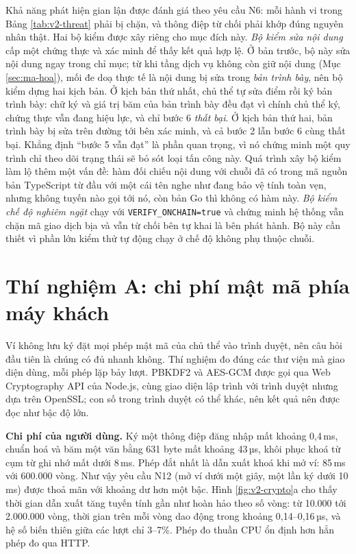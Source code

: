 Khả năng phát hiện gian lận được đánh giá theo yêu cầu N6: mỗi hành vi trong Bảng \ref{tab:v2-threat} phải bị chặn, và thông điệp từ chối phải khớp đúng nguyên nhân thật. Hai bộ kiểm được xây riêng cho mục đích này. \textit{Bộ kiểm sửa nội dung} cấp một chứng thực và xác minh để thấy kết quả hợp lệ. Ở bản trước, bộ này sửa nội dung ngay trong chỉ mục; từ khi tầng dịch vụ không còn giữ nội dung (Mục \ref{sec:ma-hoa}), mối đe doạ thực tế là nội dung bị sửa trong \emph{bản trình bày}, nên bộ kiểm dựng hai kịch bản. Ở kịch bản thứ nhất, chủ thể tự sửa điểm rồi ký bản trình bày: chữ ký và giá trị băm của bản trình bày đều đạt vì chính chủ thể ký, chứng thực vẫn đang hiệu lực, và chỉ bước 6 \emph{thất bại}. Ở kịch bản thứ hai, bản trình bày bị sửa trên đường tới bên xác minh, và cả bước 2 lẫn bước 6 cùng thất bại. Khẳng định ``bước 5 vẫn đạt'' là phần quan trọng, vì nó chứng minh một quy trình chỉ theo dõi trạng thái sẽ bỏ sót loại tấn công này. Quá trình xây bộ kiểm làm lộ thêm một vấn đề: hàm đối chiếu nội dung với chuỗi đã có trong mã nguồn bản TypeScript từ đầu với một cái tên nghe như đang bảo vệ tính toàn vẹn, nhưng không tuyến nào gọi tới nó, còn bản Go thì không có hàm này. \textit{Bộ kiểm chế độ nghiêm ngặt} chạy với \texttt{VERIFY\_ONCHAIN=true} và chứng minh hệ thống vẫn chặn mã giao dịch bịa và vẫn từ chối bên tự khai là bên phát hành. Bộ này cần thiết vì phần lớn kiểm thử tự động chạy ở chế độ không phụ thuộc chuỗi.

\section{Thí nghiệm A: chi phí mật mã phía máy khách}
\label{sec:tn-crypto}

Ví không lưu ký đặt mọi phép mật mã của chủ thể vào trình duyệt, nên câu hỏi đầu tiên là chúng có đủ nhanh không. Thí nghiệm đo đúng các thư viện mà giao diện dùng, mỗi phép lặp bảy lượt. PBKDF2 và AES-GCM được gọi qua Web Cryptography API của Node.js, cùng giao diện lập trình với trình duyệt nhưng dựa trên OpenSSL; con số trong trình duyệt có thể khác, nên kết quả nên được đọc như bậc độ lớn.





\textbf{Chi phí của người dùng.} Ký một thông điệp đăng nhập mất khoảng 0,4\,ms, chuẩn hoá và băm một văn bằng 631 byte mất khoảng 43\,µs, khôi phục khoá từ cụm từ ghi nhớ mất dưới 8\,ms. Phép đắt nhất là dẫn xuất khoá khi mở ví: 85\,ms với 600.000 vòng. Như vậy yêu cầu N12 (mở ví dưới một giây, một lần ký dưới 10\,ms) được thoả mãn với khoảng dư hơn một bậc. Hình \ref{fig:v2-crypto}a cho thấy thời gian dẫn xuất tăng tuyến tính gần như hoàn hảo theo số vòng: từ 10.000 tới 2.000.000 vòng, thời gian trên mỗi vòng dao động trong khoảng 0,14--0,16\,µs, và hệ số biến thiên giữa các lượt chỉ 3--7\%. Phép đo thuần CPU ổn định hơn hẳn phép đo qua HTTP.


